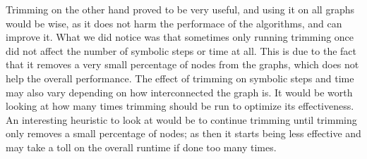 \documentclass[../master/master.tex]{subfiles}
\begin{document}
Trimming on the other hand proved to be very useful, and using it on all graphs would be wise, as it does not harm the performace of the algorithms, and can improve it. What we did notice was that sometimes only running trimming once did not affect the number of symbolic steps or time at all. This is due to the fact that it removes a very small percentage of nodes from the graphs, which does not help the overall performance. The effect of trimming on symbolic steps and time may also vary depending on how interconnected the graph is. It would be worth looking at how many times trimming should be run to optimize its effectiveness. An interesting heuristic to look at would be to continue trimming until trimming only removes a small percentage of nodes; as then it starts being less effective and may take a toll on the overall runtime if done too many times. 
\end{document}
